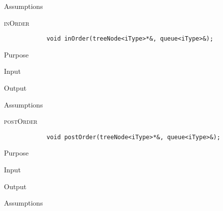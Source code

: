 \documentclass[pdftex, 12pt]{article}
\begin{document}
\begin{description}
\begin{description}
			\item{Assumptions}

		\end{description}
	\item{\textsc{inOrder}}
		\begin{lstlisting}
			void inOrder(treeNode<iType>*&, queue<iType>&);
		\end{lstlisting}
		\begin{description}

			\item{Purpose}

			\item{Input}

			\item{Output}

			\item{Assumptions}

		\end{description}
	\item{\textsc{postOrder}}
		\begin{lstlisting}
			void postOrder(treeNode<iType>*&, queue<iType>&);
		\end{lstlisting}
		\begin{description}

			\item{Purpose}

			\item{Input}

			\item{Output}

			\item{Assumptions}

		\end{description}

\end{description}
\end{document}
